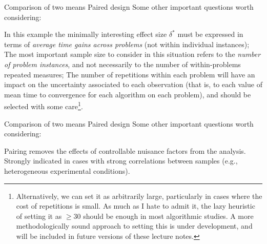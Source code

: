 \documentclass[t]{beamer}
\begin{document}
\begin{ftst}
{Comparison of two means}
{Paired design}
Some other important questions worth considering:

\bitems In this example the minimally interesting effect size $\delta^*$ must be expressed in terms of \textit{average time gains across problems} (not within individual instances);
\spitem The most important sample size to consider in this situation refers to the \textit{number of problem instances}, and not necessarily to the number of within-problems repeated measures;
\spitem The number of repetitions within each problem will have an impact on the uncertainty associated to each observation (that is, to each value of mean time to convergence for each algorithm on each problem), and should be selected with some care\footnote[1]{\tiny Alternatively, we can set it as arbitrarily large, particularly in cases where the cost of repetitions is small. As much as I hate to admit it, the lazy heuristic of setting it as $\geq 30$ should be enough in most algorithmic studies. A more methodologically sound approach to setting this is under development, and will be included in future versions of these lecture notes.}.
\eitem
\end{ftst}


\begin{ftst}
{Comparison of two means}
{Paired design}
Some other important questions worth considering:

\bitems Pairing removes the effects of controllable nuisance factors from the analysis.
\spitem
Strongly indicated in cases with strong correlations between samples (e.g., heterogeneous experimental conditions).
\eitem
\end{ftst}

\end{document}
